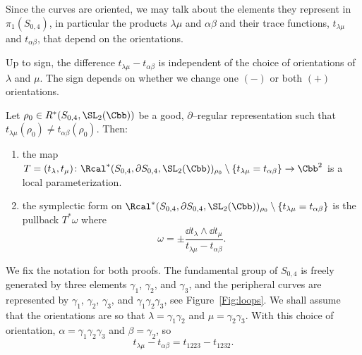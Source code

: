 Since the curves are oriented, we may talk about the elements they represent in $\pi_1(S_{0,4})$, in particular the products $\lambda\mu$ and $\alpha\beta$ and their trace functions, $t_{\lambda\mu}$ and $t_{\alpha\beta}$, that depend on the orientations.

\begin{lemm}\label{lemma:difindep}
Up to sign, the difference $t_{\lambda\mu}-t_{\alpha\beta}$ is independent of the choice of orientations of $\lambda$ and $\mu$. The sign depends on whether we change one $(-)$ or both $(+)$ orientations.
\end{lemm}

\goodbreak

\begin{prop}\label{Prop:symplectic40}
Let $\rho_0 \in R^*(S_{0,4}, \SL_2(\Cbb))$ be a good, $\partial$--regular representation such that $t_{\lambda\mu}(\rho_0)\neq t_{\alpha\beta}(\rho_0)$. Then:
\begin{enumerate}
\item \label{list-6.5.1}
the map $T=(t_\lambda,t_\mu)\colon \Rcal^*(S_{0,4},\partial S_{0,4}, \SL_2(\Cbb))_{\rho_0}\setminus\{t_{\lambda\mu}=t_{\alpha\beta}\} \to \Cbb^2 $ is a local parameterization.
\item\label{list-6.5.2}
the symplectic form on $\Rcal^*(S_{0,4},\partial S_{0,4}, \SL_2(\Cbb))_{\rho_0}\setminus\{t_{\lambda\mu}=t_{\alpha\beta}\}$ is the pullback $T^*\omega$ where
\[
\omega = \pm \frac{\dd t_\lambda\wedge \dd t_\mu}{ t_{\lambda\mu}-t_{\alpha\beta} }.
\]
\end{enumerate}
\end{prop}


We fix the notation for both proofs. The fundamental group of $S_{0,4}$ is freely generated by three elements $\gamma_1$, $\gamma_2$, and $\gamma_3$, and the peripheral curves are represented by $\gamma_1$, $\gamma_2$, $\gamma_3$, and $\gamma_1\gamma_2\gamma_3$, see Figure~\ref{Fig:loops}. We shall assume that the orientations are so that $\lambda=\gamma_1\gamma_2$ and $\mu=\gamma_2\gamma_3$. With this choice of orientation, $\alpha= \gamma_1\gamma_2\gamma_3$ and $\beta=\gamma_2$, so
\[
t_{\lambda\mu}-t_{\alpha\beta}= t_{1223}-t_{1232}.
\]

